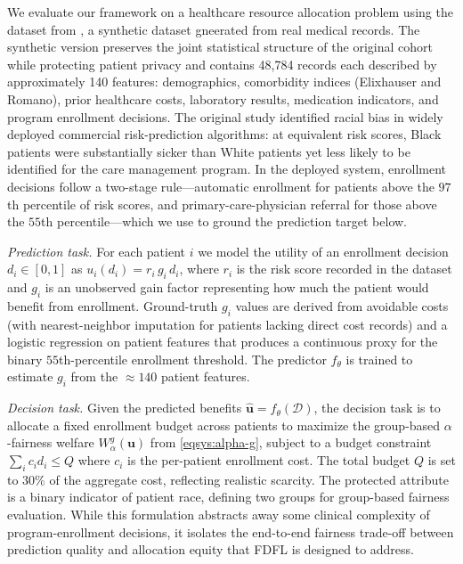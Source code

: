 \documentclass[ijoc,sglanonrev]{informs4}
\begin{document}
We evaluate our framework on a healthcare resource allocation problem using the dataset from \citet{doi:10.1126/science.aax2342}, a synthetic dataset gneerated from real medical records. The synthetic version preserves the joint statistical structure of the original cohort while protecting patient privacy and contains 48,784 records each described by approximately 140 features: demographics, comorbidity indices (Elixhauser and Romano), prior healthcare costs, laboratory results, medication indicators, and
program enrollment decisions. The original study identified racial bias in widely deployed commercial risk-prediction algorithms: at equivalent risk scores, Black patients were substantially sicker than White patients yet less likely to be identified for the care
management program. In the deployed system, enrollment decisions follow a two-stage rule---automatic enrollment for patients above the $97$th percentile of risk scores, and primary-care-physician referral for those above the $55$th percentile---which we use to
ground the prediction target below.

\emph{Prediction task.} 
For each patient $i$ we model the utility of an enrollment decision $d_i \in [0,1]$ as $u_i(d_i) = r_i\, g_i\, d_i$, where $r_i$ is the risk score recorded in the dataset and $g_i$ is an unobserved gain factor representing how much the patient would benefit from enrollment. Ground-truth $g_i$ values are derived from avoidable costs (with nearest-neighbor imputation for patients lacking direct cost records) and a logistic regression on patient features that produces a continuous proxy for the binary $55$th-percentile enrollment threshold. The predictor $f_\theta$ is trained to estimate $g_i$ from the $\approx 140$ patient features. 

\emph{Decision task.} 
Given the predicted benefits $\hat{\mathbf u} = f_\theta(\mathcal D)$, the decision task is to allocate a fixed enrollment budget across patients to maximize the group-based $\alpha$-fairness welfare $W^g_\alpha(\mathbf u)$ from \eqref{eqsys:alpha-g}, subject to a budget constraint $\sum_i c_i d_i \le Q$ where $c_i$ is the per-patient enrollment cost. The total budget $Q$ is set to $30\%$ of the aggregate cost, reflecting realistic scarcity. The protected attribute is a binary indicator of patient race, defining two groups for group-based fairness evaluation. While this formulation abstracts away some clinical complexity of program-enrollment decisions, it isolates the end-to-end fairness trade-off between prediction quality and allocation equity that FDFL is designed to address.
\end{document}
